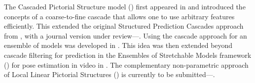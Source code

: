 The Cascaded Pictorial Structure model () first appeared in 
\citet{sapp2010cascades} and introduced the concepts of a coarse-to-fine 
cascade that allows one to use arbitrary features efficiently.  This extended 
the original Structured Prediction Cascades approach from \citet{cascades}, 
with a journal version under review---\citet{cascades-jmlr}.
Using the cascade approach for an ensemble of models was developed in 
\citet{weisssapp10}.  This idea was then extended beyond cascade filtering for 
prediction in the Ensembles of Stretchable Models framework 
() for pose estimation in video in \citet{sapp2011}.  The 
complementary non-parametric approach of Local Linear Pictorial Structures 
() is currently to be submitted---\citet{sapp-llps}.

